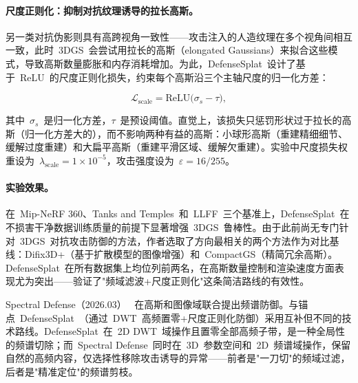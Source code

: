 \paragraph{尺度正则化：抑制对抗纹理诱导的拉长高斯。}
另一类对抗伪影则具有高跨视角一致性——攻击注入的人造纹理在多个视角间相互一致，此时~3DGS~会尝试用拉长的高斯（elongated Gaussians）来拟合这些模式，导致高斯数量膨胀和内存消耗增加。为此，DefenseSplat~设计了基于~ReLU~的尺度正则化损失，约束每个高斯沿三个主轴尺度的归一化方差：

\begin{equation}
\mathcal{L}_{\mathrm{scale}} = \mathrm{ReLU}\bigl(\sigma_s - \tau\bigr),
\end{equation}

其中~$\sigma_s$~是归一化方差，$\tau$~是预设阈值。直觉上，该损失只惩罚形状过于拉长的高斯（归一化方差大的），而不影响两种有益的高斯：小球形高斯（重建精细细节、缓解过度重建）和大扁平高斯（重建平滑区域、缓解欠重建）。实验中尺度损失权重设为~$\lambda_{\mathrm{scale}} = 1 \times 10^{-5}$，攻击强度设为~$\varepsilon = 16/255$。

\paragraph{实验效果。}
在~Mip-NeRF 360、Tanks and Temples~和~LLFF~三个基准上，DefenseSplat~在不损害干净数据训练质量的前提下显著增强~3DGS~鲁棒性。由于此前尚无专门针对~3DGS~对抗攻击防御的方法，作者选取了方向最相关的两个方法作为对比基线：Difix3D+（基于扩散模型的图像增强）和~CompactGS（精简冗余高斯）。DefenseSplat~在所有数据集上均位列前两名，在高斯数量控制和渲染速度方面表现尤为突出——验证了"频域滤波+尺度正则化"这条简洁路线的有效性。

Spectral Defense（2026.03）~\cite{2603_12796} 在高斯和图像域联合提出频谱防御。与锚点~DefenseSplat~（通过~DWT~高频置零+尺度正则化防御）采用互补但不同的技术路线。DefenseSplat~在~2D DWT~域操作且置零全部高频子带，是一种全局性的频谱切除；而~Spectral Defense~同时在~3D~参数空间和~2D~频谱域操作，保留自然的高频内容，仅选择性移除攻击诱导的异常——前者是"一刀切"的频域过滤，后者是"精准定位"的频谱剪枝。

